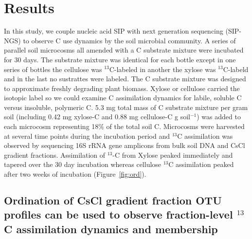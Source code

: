 \section{Results}
In this study, we couple nucleic acid SIP with next generation sequencing
(SIP-NGS) to observe C use dynamics by the soil microbial community. A series
of parallel soil microcosms all amended with a C substrate mixture were
incubated for 30 days. The substrate mixture was identical for each bottle
except in one series of bottles the cellulose was $^{13}$C-labeled in another
the xylose was $^{13}$C-labeld and in the last no sustrattes were labeled. The
C substrate mixture was designed to approximate freshly degrading plant
biomass. Xylose or cellulose carried the isotopic label so we could examine C
assimilation dynamics for labile, soluble C versus insoluble, polymeric C. 5.3
mg total mass of C substrate mixture per gram soil (including 0.42 mg xylose-C
and 0.88 mg cellulose-C g soil$^{-1}$) was added to each microcosm representing
18\% of the total soil C. Microcosms were harvested at several time points
during the incubation period and $^{13}$C assimilation was observed by
sequencing 16S rRNA gene amplicons from bulk soil DNA and CsCl gradient
fractions. Assimilation of $^{13}$-C from Xylose peaked immediately and tapered
over the 30 day incubation whereas cellulose $^{13}$C assimilation peaked after
two weeks of incubation (Figure~\ref{fig:ord}).

\subsection{Ordination of CsCl gradient fraction OTU profiles can be used to
observe fraction-level $^{13}$C assimilation dynamics and membership}

